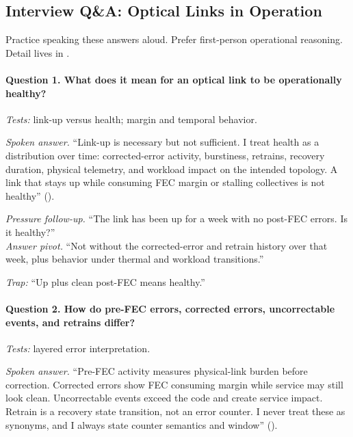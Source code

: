 \subsection{Interview Q\&A: Optical Links in Operation}
\label{sec:networking-interview-qa}

Practice speaking these answers aloud. Prefer first-person operational
reasoning. Detail lives in
.

\paragraph{Question 1. What does it mean for an optical link to be
operationally healthy?}
\textit{Tests:} link-up versus health; margin and temporal behavior.

\textit{Spoken answer.}
``Link-up is necessary but not sufficient. I treat health as a distribution
over time: corrected-error activity, burstiness, retrains, recovery duration,
physical telemetry, and workload impact on the intended topology. A link that
stays up while consuming FEC margin or stalling collectives is not healthy''
().

\textit{Pressure follow-up.} ``The link has been up for a week with no
post-FEC errors. Is it healthy?''\\
\textit{Answer pivot.} ``Not without the corrected-error and retrain history
over that week, plus behavior under thermal and workload transitions.''

\textit{Trap:} ``Up plus clean post-FEC means healthy.''

\paragraph{Question 2. How do pre-FEC errors, corrected errors, uncorrectable
events, and retrains differ?}
\textit{Tests:} layered error interpretation.

\textit{Spoken answer.}
``Pre-FEC activity measures physical-link burden before correction. Corrected
errors show FEC consuming margin while service may still look clean.
Uncorrectable events exceed the code and create service impact. Retrain is a
recovery state transition, not an error counter. I never treat these as
synonyms, and I always state counter semantics and window''
().

